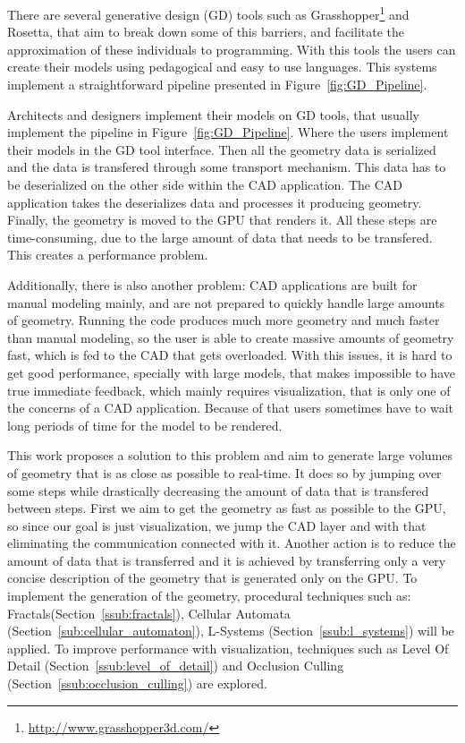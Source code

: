 There are several generative design (GD) tools such as Grasshopper\footnote{\url{http://www.grasshopper3d.com/}} and Rosetta\cite{Leit2012}, that aim to break down some of this barriers, and facilitate the approximation of these individuals to programming. With this tools the users can create their models using pedagogical and easy to use languages. This systems implement a straightforward pipeline presented in Figure~\ref{fig:GD_Pipeline}.



Architects and designers implement their models on GD tools, that usually implement the pipeline in Figure~\ref{fig:GD_Pipeline}. Where the users implement their models in the GD tool interface. Then all the geometry data is serialized and the data is transfered through some transport mechanism. This data has to be deserialized on the other side within the CAD application. The CAD application takes the deserializes data and processes it producing geometry. Finally, the geometry is moved to the GPU that renders it. All these steps are time-consuming, due to the large amount of data that needs to be transfered. This creates a performance problem.

Additionally, there is also another problem: CAD applications are built for manual modeling mainly, and are not prepared to quickly handle large amounts of geometry. Running the code produces much more geometry and much faster than manual modeling, so the user is able to create massive amounts of geometry fast, which is fed to the CAD that gets overloaded. With this issues, it is hard to get good performance, specially with large models, that makes impossible to have true immediate feedback, which mainly requires visualization, that is only one of the concerns of a CAD application. Because of that users sometimes have to wait long periods of time for the model to be rendered.

This work proposes a solution to this problem and aim to generate large volumes of geometry that is as close as possible to real-time. It does so by jumping over some steps while drastically decreasing the amount of data that is transfered between steps. First we aim to get the geometry as fast as possible to the GPU, so since our goal is just visualization, we jump the CAD layer and with that eliminating the communication connected with it. Another action is to reduce the amount of data that is transferred and it is achieved by transferring only a very concise description of the geometry that is generated only on the GPU. To implement the generation of the geometry, procedural techniques such as: Fractals(Section~\ref{ssub:fractals}), Cellular Automata (Section~\ref{sub:cellular_automaton}), L-Systems (Section~\ref{ssub:l_systems}) will be applied. 
To improve performance with visualization, techniques such as Level Of Detail (Section~\ref{ssub:level_of_detail}) and Occlusion Culling (Section~\ref{ssub:occlusion_culling}) are explored.

